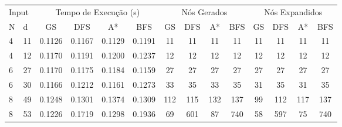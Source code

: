 \documentclass[12pt,a4paper]{article}
\begin{document}
\begin{adjustbox}{width={\textwidth}, totalheight={\textheight}, keepaspectratio}
  \begin{tabular}{ll cccc cccc cccc}
    \toprule
    \multicolumn{2}{l}{Input} & \multicolumn{4}{c}{Tempo de Execução (s)} & \multicolumn{4}{c}{Nós Gerados} & \multicolumn{4}{c}{Nós Expandidos}                                                                                   \\
    \cmidrule(lr){1-2} \cmidrule(lr){3-6} \cmidrule(lr){7-10} \cmidrule(lr){11-14}
    N                         & d                                         & GS                              & DFS                                & A*     & BFS    & GS    & DFS   & A*    & BFS   & GS    & DFS   & A*    & BFS   \\
    \midrule
    4                         & 11                                        & 0.1126                          & 0.1167                             & 0.1129 & 0.1191 & 11    & 11    & 11    & 11    & 11    & 11    & 11    & 11    \\
    4                         & 12                                        & 0.1170                          & 0.1191                             & 0.1200 & 0.1237 & 12    & 12    & 12    & 12    & 12    & 12    & 12    & 12    \\
    6                         & 27                                        & 0.1170                          & 0.1175                             & 0.1184 & 0.1159 & 27    & 27    & 27    & 27    & 27    & 27    & 27    & 27    \\
    6                         & 30                                        & 0.1166                          & 0.1212                             & 0.1161 & 0.1273 & 33    & 35    & 33    & 35    & 31    & 35    & 31    & 35    \\
    8                         & 49                                        & 0.1248                          & 0.1301                             & 0.1374 & 0.1309 & 112   & 115   & 132   & 137   & 99    & 112   & 117   & 137   \\
    8                         & 53                                        & 0.1226                          & 0.1719                             & 0.1298 & 0.1936 & 69    & 601   & 87    & 740   & 58    & 597   & 75    & 740   \\

\end{tabular}
\end{adjustbox}
\end{document}
